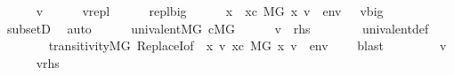 \begin{isabellebody}
\ \ \ \ \isamarkupfalse%
\ v\isanewline
\ \ \ \ \isamarkupfalse%
\ {\isachardoublequoteopen}v{\isasymin}{\isacharquery}{\kern0pt}repl{\isachardoublequoteclose}\isanewline
\ \ \ \ \isamarkupfalse%
\ {\isacartoucheopen}{\isacharquery}{\kern0pt}repl{\isasymsubseteq}{\isacharquery}{\kern0pt}big{\isacartoucheclose}\isanewline
\ \ \ \ \isamarkupfalse%
\ x\ \ {\isachardoublequoteopen}x{\isasymin}c{\isachardoublequoteclose}\ {\isachardoublequoteopen}M{\isacharbrackleft}{\kern0pt}G{\isacharbrackright}{\kern0pt}{\isacharcomma}{\kern0pt}\ {\isacharbrackleft}{\kern0pt}x{\isacharcomma}{\kern0pt}\ v{\isacharbrackright}{\kern0pt}\ {\isacharat}{\kern0pt}\ env\ {\isasymTurnstile}\ {\isasymphi}{\isachardoublequoteclose}\ {\isachardoublequoteopen}v{\isasymin}{\isacharquery}{\kern0pt}big{\isachardoublequoteclose}\isanewline
\ \ \ \ \ \ \isamarkupfalse%
\ subsetD\ \isamarkupfalse%
\ auto\isanewline
\ \ \ \ \isamarkupfalse%
\ {\isacartoucheopen}univalent{\isacharparenleft}{\kern0pt}{\isacharhash}{\kern0pt}{\isacharhash}{\kern0pt}M{\isacharbrackleft}{\kern0pt}G{\isacharbrackright}{\kern0pt}{\isacharcomma}{\kern0pt}{\isacharunderscore}{\kern0pt}{\isacharcomma}{\kern0pt}{\isacharunderscore}{\kern0pt}{\isacharparenright}{\kern0pt}{\isacartoucheclose}\ {\isacartoucheopen}c{\isasymin}M{\isacharbrackleft}{\kern0pt}G{\isacharbrackright}{\kern0pt}{\isacartoucheclose}\isanewline
\ \ \ \ \isamarkupfalse%
\ {\isachardoublequoteopen}v\ {\isasymin}\ {\isacharquery}{\kern0pt}rhs{\isachardoublequoteclose}\isanewline
\ \ \ \ \ \ \isamarkupfalse%
\ univalent{\isacharunderscore}{\kern0pt}def\isanewline
\ \ \ \ \ \ \isamarkupfalse%
\ transitivity{\isacharunderscore}{\kern0pt}MG\ ReplaceI{\isacharbrackleft}{\kern0pt}of\ {\isachardoublequoteopen}{\isasymlambda}\ x\ v{\isachardot}{\kern0pt}\ {\isasymexists}x{\isasymin}c{\isachardot}{\kern0pt}\ M{\isacharbrackleft}{\kern0pt}G{\isacharbrackright}{\kern0pt}{\isacharcomma}{\kern0pt}\ {\isacharbrackleft}{\kern0pt}x{\isacharcomma}{\kern0pt}\ v{\isacharbrackright}{\kern0pt}\ {\isacharat}{\kern0pt}\ env\ {\isasymTurnstile}\ {\isasymphi}{\isachardoublequoteclose}{\isacharbrackright}{\kern0pt}\ \isamarkupfalse%
\ blast\isanewline
\ \ \isamarkupfalse%
\isanewline
\ \ \ \ \isamarkupfalse%
\ v\isanewline
\ \ \ \ \isamarkupfalse%
\ {\isachardoublequoteopen}v{\isasymin}{\isacharquery}{\kern0pt}rhs{\isachardoublequoteclose}\isanewline

\end{isabellebody}

